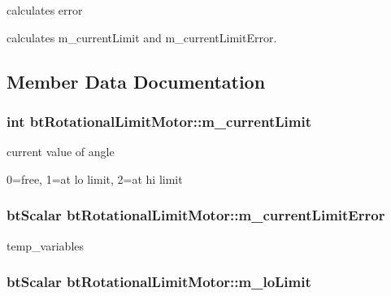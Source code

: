 calculates error 

calculates m\+\_\+current\+Limit and m\+\_\+current\+Limit\+Error. 

\subsection{Member Data Documentation}
\hypertarget{classbt_rotational_limit_motor_ad1e4fa6cb3ea2e4b78c96feab97448e8}{
\subsubsection[{m\+\_\+current\+Limit}]{\setlength{\rightskip}{0pt plus 5cm}int bt\+Rotational\+Limit\+Motor\+::m\+\_\+current\+Limit}}\label{classbt_rotational_limit_motor_ad1e4fa6cb3ea2e4b78c96feab97448e8}


current value of angle 

0=free, 1=at lo limit, 2=at hi limit \hypertarget{classbt_rotational_limit_motor_a7128feccb391176842f287b584e375d3}{
\subsubsection[{m\+\_\+current\+Limit\+Error}]{\setlength{\rightskip}{0pt plus 5cm}bt\+Scalar bt\+Rotational\+Limit\+Motor\+::m\+\_\+current\+Limit\+Error}}\label{classbt_rotational_limit_motor_a7128feccb391176842f287b584e375d3}
temp\+\_\+variables \hypertarget{classbt_rotational_limit_motor_a57ff414e1856d661d81b797702c4f986}{
\subsubsection[{m\+\_\+lo\+Limit}]{\setlength{\rightskip}{0pt plus 5cm}bt\+Scalar bt\+Rotational\+Limit\+Motor\+::m\+\_\+lo\+Limit}}\label{classbt_rotational_limit_motor_a57ff414e1856d661d81b797702c4f986}


